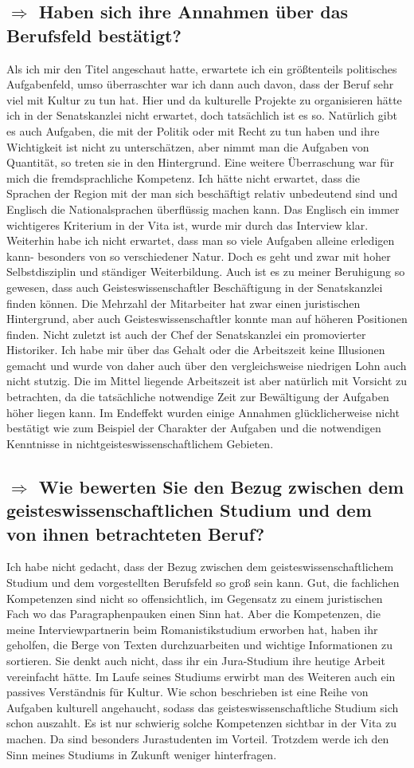 \documentclass[12pt,headsepline,a4paper]{scrartcl}
\newcommand\quest[1]{\subsection*{$\Rightarrow$ #1}}
\begin{document}
\quest{Haben sich ihre Annahmen über das Berufsfeld bestätigt?}
Als ich mir den Titel angeschaut hatte, erwartete ich ein größtenteils politisches Aufgabenfeld, umso überraschter war ich dann auch davon, dass der Beruf sehr viel mit Kultur zu tun hat. Hier und da kulturelle Projekte zu organisieren hätte ich in der Senatskanzlei nicht erwartet, doch tatsächlich ist es so. Natürlich gibt es auch Aufgaben, die mit der Politik oder mit Recht zu tun haben und ihre Wichtigkeit ist nicht zu  unterschätzen, aber nimmt man die Aufgaben von Quantität, so treten sie in den Hintergrund.
Eine weitere Überraschung war für mich die fremdsprachliche Kompetenz. Ich hätte nicht erwartet, dass die Sprachen der Region mit der man sich beschäftigt relativ unbedeutend sind und Englisch die Nationalsprachen überflüssig machen kann. Das Englisch ein immer wichtigeres Kriterium in der Vita ist, wurde mir durch das Interview klar.
Weiterhin habe ich nicht erwartet, dass man so viele Aufgaben alleine erledigen kann- besonders von so verschiedener Natur. Doch es geht und zwar mit hoher Selbstdisziplin und ständiger Weiterbildung. 
Auch ist es zu meiner Beruhigung so gewesen, dass auch Geisteswissenschaftler Beschäftigung in der Senatskanzlei finden können. Die Mehrzahl der Mitarbeiter hat zwar einen juristischen Hintergrund, aber auch Geisteswissenschaftler konnte man auf höheren Positionen finden. Nicht zuletzt ist auch der Chef der Senatskanzlei ein promovierter Historiker.
Ich habe mir über das Gehalt oder die Arbeitszeit keine Illusionen gemacht und wurde von daher auch über den vergleichsweise niedrigen Lohn auch  nicht stutzig. Die im Mittel liegende Arbeitszeit ist aber natürlich mit Vorsicht zu betrachten, da die tatsächliche notwendige Zeit zur Bewältigung der Aufgaben höher liegen kann.
Im Endeffekt wurden einige Annahmen glücklicherweise nicht bestätigt wie zum Beispiel der Charakter der Aufgaben und die notwendigen Kenntnisse in nichtgeisteswissenschaftlichem Gebieten.

\quest{Wie bewerten Sie den Bezug zwischen dem geisteswissenschaftlichen Studium und dem von ihnen betrachteten Beruf?}
Ich habe nicht gedacht, dass der Bezug zwischen dem geisteswissenschaftlichem Studium und dem vorgestellten Berufsfeld so groß sein kann. Gut, die fachlichen Kompetenzen sind nicht so offensichtlich, im Gegensatz zu einem juristischen Fach wo das Paragraphenpauken einen Sinn hat. Aber die  Kompetenzen, die meine Interviewpartnerin beim Romanistikstudium erworben hat, haben ihr geholfen, die Berge von Texten durchzuarbeiten und wichtige Informationen zu sortieren. Sie denkt auch nicht, dass ihr ein Jura-Studium ihre heutige Arbeit vereinfacht hätte.
Im Laufe seines Studiums erwirbt man des Weiteren auch ein passives Verständnis für Kultur. Wie schon beschrieben ist eine Reihe von Aufgaben kulturell angehaucht, sodass das geisteswissenschaftliche Studium sich schon auszahlt.
Es ist nur schwierig solche Kompetenzen sichtbar in der Vita zu machen. Da sind besonders Jurastudenten im Vorteil. Trotzdem werde ich den Sinn meines Studiums in Zukunft weniger hinterfragen.
\end{document}
